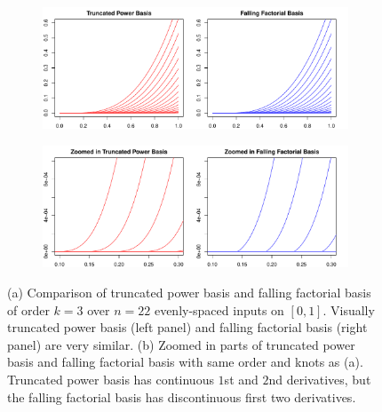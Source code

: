 \documentclass[a4paper]{article}
\begin{document}
\begin{figure}[t!]
\centering
   \begin{subfigure}[b]{1\textwidth}
   \includegraphics[width=1\linewidth]{Figures/Figure8.pdf}
   \caption{}
   \label{fig:8a}
\end{subfigure}

\begin{subfigure}[b]{1\textwidth}
   \includegraphics[width=1\linewidth]{Figures/Figure8b.pdf}
   \caption{}
   \label{fig:8b}
\end{subfigure}

\caption[Two numerical solutions]{(a) Comparison of truncated power basis and falling factorial basis of order $k=3$ over $n=22$ evenly-spaced inputs on $[0, 1]$. Visually truncated power basis (left panel) and falling factorial basis (right panel) are very similar. (b) Zoomed in parts of truncated power basis and falling factorial basis with same order and knots as (a). Truncated power basis has continuous $1$st and $2$nd derivatives, but the falling factorial basis has discontinuous first two derivatives.}
\label{fig:Figure8_fall}
\end{figure}


\end{document}
